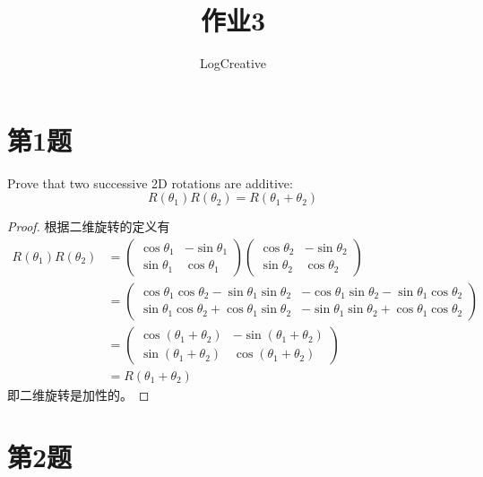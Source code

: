\documentclass[math-font=newcm]{sjtuarticle}
\title{作业3}
\author{LogCreative}
\begin{document}
\maketitle

\tableofcontents*

\section{第1题}

Prove that two successive 2D rotations are additive:
\begin{equation}
    R(\theta_1) R(\theta_2) = R(\theta_1 + \theta_2) 
\end{equation}

\begin{proof}
    根据二维旋转的定义有
    \begin{align*}
        R(\theta_1)R(\theta_2)&=\begin{pmatrix}
            \cos\theta_1 & -\sin\theta_1 \\
            \sin\theta_1 & \cos\theta_1
        \end{pmatrix}\begin{pmatrix}
            \cos\theta_2 & -\sin\theta_2 \\
            \sin\theta_2 & \cos\theta_2
        \end{pmatrix} \\
        &=\begin{pmatrix}
            \cos\theta_1\cos\theta_2-\sin\theta_1\sin\theta_2 &
            -\cos\theta_1\sin\theta_2-\sin\theta_1\cos\theta_2 \\
            \sin\theta_1\cos\theta_2+\cos\theta_1\sin\theta_2 &
            -\sin\theta_1\sin\theta_2+\cos\theta_1\cos\theta_2
        \end{pmatrix} \\
        &=\begin{pmatrix}
            \cos(\theta_1+\theta_2) & -\sin(\theta_1+\theta_2) \\
            \sin(\theta_1+\theta_2) & \cos(\theta_1+\theta_2)
        \end{pmatrix}\\
        &=R(\theta_1+\theta_2)
    \end{align*}
    即二维旋转是加性的。
\end{proof}

\section{第2题}
\end{document}
